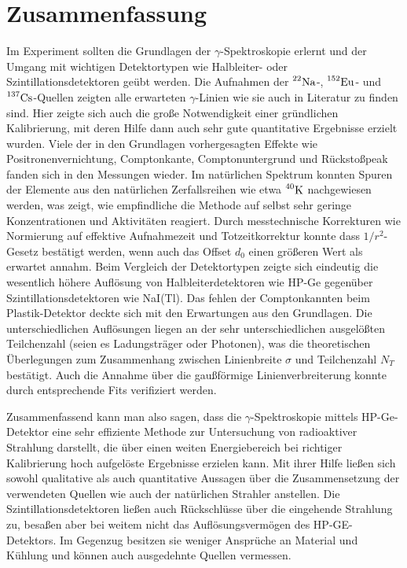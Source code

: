 \section{Zusammenfassung}
\label{sec:zammfassung}
	
	Im Experiment sollten die Grundlagen der $\gamma$-Spektroskopie erlernt und der Umgang mit wichtigen Detektortypen wie Halbleiter- oder Szintillationsdetektoren geübt werden.
	Die Aufnahmen der $\prescript{22}{}{\mathrm{Na}}$-, $\prescript{152}{}{\mathrm{Eu}}$- und $\prescript{137}{}{\mathrm{Cs}}$-Quellen zeigten alle erwarteten $\gamma$-Linien wie sie auch in Literatur zu finden sind.
	Hier zeigte sich auch die große Notwendigkeit einer gründlichen Kalibrierung, mit deren Hilfe dann auch sehr gute quantitative Ergebnisse erzielt wurden.
	Viele der in den Grundlagen vorhergesagten Effekte wie Positronenvernichtung, Comptonkante, Comptonuntergrund und Rückstoßpeak fanden sich in den Messungen wieder.
	Im natürlichen Spektrum konnten Spuren der Elemente aus den natürlichen Zerfallsreihen wie etwa $\prescript{40}{}{\mathrm{K}}$ nachgewiesen werden, was zeigt, wie empfindliche die Methode auf selbst sehr geringe Konzentrationen und Aktivitäten reagiert.
	Durch messtechnische Korrekturen wie Normierung auf effektive Aufnahmezeit und Totzeitkorrektur konnte dass $1/r^2$-Gesetz bestätigt werden, wenn auch das Offset $d_0$ einen größeren Wert als erwartet annahm.
	Beim Vergleich der Detektortypen zeigte sich eindeutig die wesentlich höhere Auflösung von Halbleiterdetektoren wie HP-Ge gegenüber Szintillationsdetektoren wie NaI(Tl).
	Das fehlen der Comptonkannten beim Plastik-Detektor deckte sich mit den Erwartungen aus den Grundlagen.
	Die unterschiedlichen Auflösungen liegen an der sehr unterschiedlichen ausgelößten Teilchenzahl (seien es Ladungsträger oder Photonen), was die theoretischen Überlegungen zum Zusammenhang zwischen Linienbreite $\sigma$ und Teilchenzahl $N_T$ bestätigt.
	Auch die Annahme über die gaußförmige Linienverbreiterung konnte durch entsprechende Fits verifiziert werden.

	Zusammenfassend kann man also sagen, dass die $\gamma$-Spektroskopie mittels HP-Ge-Detektor eine sehr effiziente Methode zur Untersuchung von radioaktiver Strahlung darstellt, die über einen weiten Energiebereich bei richtiger Kalibrierung hoch aufgelöste Ergebnisse erzielen kann.
	Mit ihrer Hilfe ließen sich sowohl qualitative als auch quantitative Aussagen über die Zusammensetzung der verwendeten Quellen wie auch der natürlichen Strahler anstellen.
	Die Szintillationsdetektoren ließen auch Rückschlüsse über die eingehende Strahlung zu, besaßen aber bei weitem nicht das Auflösungsvermögen des HP-GE-Detektors.
	Im Gegenzug besitzen sie weniger Ansprüche an Material und Kühlung und können auch ausgedehnte Quellen vermessen.


